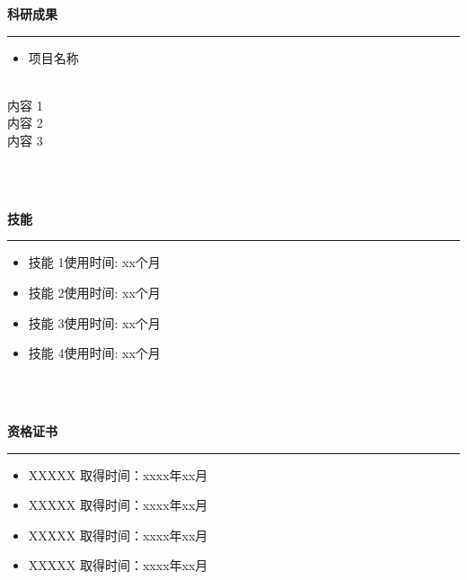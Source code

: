 \documentclass{article}
\theoremstyle{plain}
\begin{document}
\begin{flushleft}
\MakeUppercase{\LARGE\textbf{科研成果}} 
\end{flushleft}  %
\rule[4pt]{18cm}{0.5pt} %
\begin{itemize}
	\item{\normalsize{项目名称}}
\end{itemize}
\\{内容 1}
\\{内容 2}
\\
{内容 3}

\\\hspace*{\fill}\\ %




\begin{flushleft}
\MakeUppercase{\LARGE\textbf{技能}} %
\end{flushleft}
\rule[4pt]{18cm}{0.5pt} %
\begin{itemize}
	\item{\normalsize{技能 1}\hfill{使用时间: xx个月}}
	\item{\normalsize{技能 2}\hfill{使用时间: xx个月}}
	\item{\normalsize{技能 3}\hfill{使用时间: xx个月}}
	\item{\normalsize{技能 4}\hfill{使用时间: xx个月}}
\end{itemize}

\\\hspace*{\fill}\\ %
\begin{flushleft}
\MakeUppercase{\LARGE\textbf{资格证书}} %
\end{flushleft}
\rule[4pt]{18cm}{0.5pt} %
\begin{itemize}
	\item{\normalsize{XXXXX }\hfill{取得时间：xxxx年xx月}}
	\item{\normalsize{XXXXX }\hfill{取得时间：xxxx年xx月}}
	\item{\normalsize{XXXXX }\hfill{取得时间：xxxx年xx月}}
	\item{\normalsize{XXXXX }\hfill{取得时间：xxxx年xx月}}	
\end{itemize}
\end{document}
